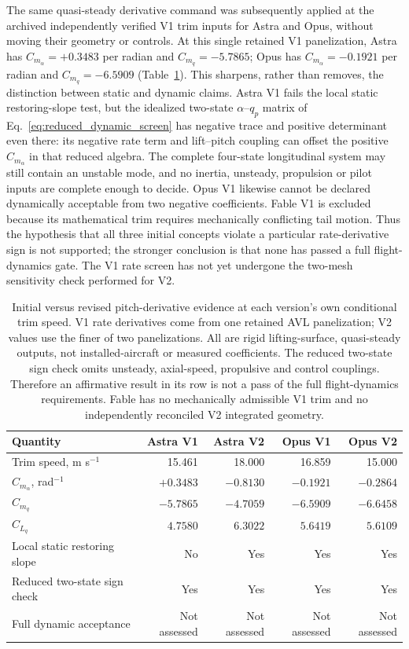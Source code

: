 \documentclass[11pt,a4paper]{article}
\begin{document}
The same quasi-steady derivative command was subsequently applied at the archived independently verified V1 trim inputs for Astra and Opus, without moving their geometry or controls. At this single retained V1 panelization, Astra has $C_{m_\alpha}=+0.3483$ per radian and $C_{m_q}=-5.7865$; Opus has $C_{m_\alpha}=-0.1921$ per radian and $C_{m_q}=-6.5909$ (Table~\ref{tab:v1v2dynamic}). This sharpens, rather than removes, the distinction between static and dynamic claims. Astra V1 fails the local static restoring-slope test, but the idealized two-state $\alpha$--$q_p$ matrix of Eq.~\ref{eq:reduced_dynamic_screen} has negative trace and positive determinant even there: its negative rate term and lift--pitch coupling can offset the positive $C_{m_\alpha}$ in that reduced algebra. The complete four-state longitudinal system may still contain an unstable mode, and no inertia, unsteady, propulsion or pilot inputs are complete enough to decide. Opus V1 likewise cannot be declared dynamically acceptable from two negative coefficients. Fable V1 is excluded because its mathematical trim requires mechanically conflicting tail motion. Thus the hypothesis that all three initial concepts violate a particular rate-derivative sign is not supported; the stronger conclusion is that none has passed a full flight-dynamics gate. The V1 rate screen has not yet undergone the two-mesh sensitivity check performed for V2.

\begin{table}[H]\centering\footnotesize
\caption{Initial versus revised pitch-derivative evidence at each version's own conditional trim speed. V1 rate derivatives come from one retained AVL panelization; V2 values use the finer of two panelizations. All are rigid lifting-surface, quasi-steady outputs, not installed-aircraft or measured coefficients. The reduced two-state sign check omits unsteady, axial-speed, propulsive and control couplings. Therefore an affirmative result in its row is not a pass of the full flight-dynamics requirements. Fable has no mechanically admissible V1 trim and no independently reconciled V2 integrated geometry.}\label{tab:v1v2dynamic}
\begin{tabular}{lrrrr}\toprule
Quantity & Astra V1 & Astra V2 & Opus V1 & Opus V2\\\midrule
Trim speed, m s$^{-1}$ & 15.461 & 18.000 & 16.859 & 15.000\\
$C_{m_\alpha}$, rad$^{-1}$ & $+0.3483$ & $-0.8130$ & $-0.1921$ & $-0.2864$\\
$C_{m_q}$ & $-5.7865$ & $-4.7059$ & $-6.5909$ & $-6.6458$\\
$C_{L_q}$ & $4.7580$ & $6.3022$ & $5.6419$ & $5.6109$\\
Local static restoring slope & No & Yes & Yes & Yes\\
Reduced two-state sign check & Yes & Yes & Yes & Yes\\
Full dynamic acceptance & Not assessed & Not assessed & Not assessed & Not assessed\\\bottomrule
\end{tabular}
\end{table}
\end{document}
